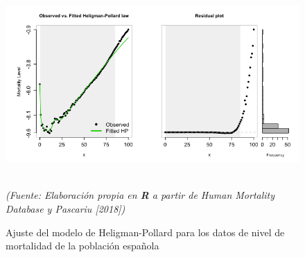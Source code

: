 \begin{figure}[!htp]
\centering
\includegraphics[scale=0.6]{Cap2/mortlaw02.png}
\captionsetup{width=1.1\linewidth}
\caption[Ajuste del modelo de Heligman-Pollard]{Ajuste del modelo de Heligman-Pollard para los datos de nivel de mortalidad de la población española}\\
\textit{(Fuente: Elaboración propia en \textbf{R} a partir de Human Mortality Database y Pascariu [2018])}
\end{figure}

